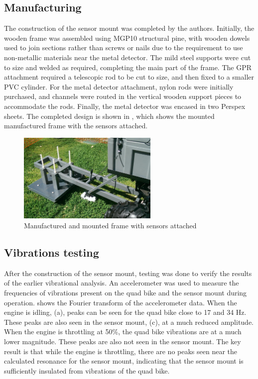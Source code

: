 \documentclass[main.tex]{subfiles}
\begin{document}
\subsection{Manufacturing}
The construction of the sensor mount was completed by the authors. Initially, the wooden frame was assembled using MGP10 structural pine, with wooden dowels used to join sections rather than screws or nails due to the requirement to use non-metallic materials near the metal detector. The mild steel supports were cut to size and welded as required, completing the main part of the frame. The GPR attachment required a telescopic rod to be cut to size, and then fixed to a smaller PVC cylinder. For the metal detector attachment, nylon rods were initially purchased, and channels were routed in the vertical wooden support pieces to accommodate the rods. Finally, the metal detector was encased in two Perspex sheets. The completed design is shown in , which shows the mounted manufactured frame with the sensors attached. 
\begin{figure}[!ht]
\includegraphics[width=0.6\textwidth]{4-DetailedDesign/QuadBikeFinalFrame.jpg}
\centering
\caption{Manufactured and mounted frame with sensors attached} 
\end{figure}

\subsection{Vibrations testing}
After the construction of the sensor mount, testing was done to verify the results of the earlier vibrational analysis. An accelerometer was used to measure the frequencies of vibrations present on the quad bike and the sensor mount during operation.  shows the Fourier transform of the accelerometer data. When the engine is idling,  (a), peaks can be seen for the quad bike close to 17 and 34 Hz. These peaks are also seen in the sensor mount,  (c), at a much reduced amplitude. When the engine is throttling at 50\%, the quad bike vibrations are at a much lower magnitude. These peaks are also not seen in the sensor mount. The key result is that while the engine is throttling, there are no peaks seen near the calculated resonance for the sensor mount, indicating that the sensor mount is sufficiently insulated from vibrations of the quad bike. 
\end{document}
